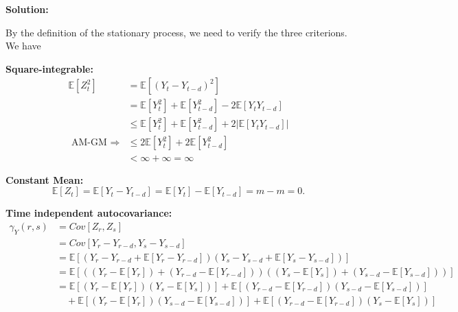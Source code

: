 \documentclass[11pt]{article}
\theoremstyle{plain} %
\newenvironment{solution}
{\color{C2}\normalfont\begin{framed}\begingroup\textbf{Solution:} }
  {\endgroup\end{framed}}
\theoremstyle{remark}
\newcommand{\EE}{\mathbb{E}}
\begin{document}
\begin{solution}
\begin{enumerate}[label = (\alph*)]
{		\item By the definition of the stationary process, we need to verify the three criterions. We have
		      \begin{enumerate}[label=(\roman*)]{
			      \item  \textbf{Square-integrable:}
			            \begin{align*}
				            \EE[Z_{t}^{2}] & = \EE[(Y_{t}-Y_{t-d})^{2}]                                 \\
				                           & = \EE[Y_{t}^{2}]+\EE[Y_{t-d}^{2}] - 2\EE[Y_{t}Y_{t-d}]     \\
				                           & \le \EE[Y_{t}^{2}]+\EE[Y_{t-d}^{2}] + 2|\EE[Y_{t}Y_{t-d}]| \\
				            \text{ AM-GM }\Longrightarrow
				                           & \le 2\EE[Y_{t}^{2}]+2\EE[Y_{t-d}^{2}]                      \\
				                           & < \infty + \infty = \infty
			            \end{align*}
			      \item \textbf{Constant Mean:}
			            $$
				            \EE[Z_{t}] = \EE[Y_{t}-Y_{t-d}] = \EE[Y_{t}]-\EE[Y_{t-d}] = m - m = 0.
			            $$
			      \item \textbf{Time independent autocovariance:}
			            \begin{align*}
				            \gamma_{Y}(r,s) & = Cov[Z_{r}, Z_{s}]                                                                                                  \\
				                            & = Cov[Y_{r}-Y_{r-d}, Y_{s}-Y_{s-d}]                                                                                  \\
				                            & = \EE[\left(Y_{r}-Y_{r-d} + \EE[Y_{r}-Y_{r-d}]\right)\left(Y_{s}-Y_{s-d} + \EE[Y_{s}-Y_{s-d}]\right)]                \\
				                            & = \EE[\left((Y_{r}-\EE[Y_{r}])+(Y_{r-d}-\EE[Y_{r-d}])\right)\left((Y_{s}-\EE[Y_{s}])+(Y_{s-d}-\EE[Y_{s-d}]) \right)] \\
				                            & = \EE[(Y_{r}-\EE[Y_{r}])(Y_{s}-\EE[Y_{s}])] + \EE[(Y_{r-d}-\EE[Y_{r-d}])(Y_{s-d}-\EE[Y_{s-d}])]                      \\
				                            & \quad + \EE[(Y_{r}-\EE[Y_{r}])(Y_{s-d}-\EE[Y_{s-d}])]+ \EE[(Y_{r-d}-\EE[Y_{r-d}])(Y_{s}-\EE[Y_{s}])]                 \\

\end{align*}}
\end{enumerate}}
\end{enumerate}
\end{solution}
\end{document}
